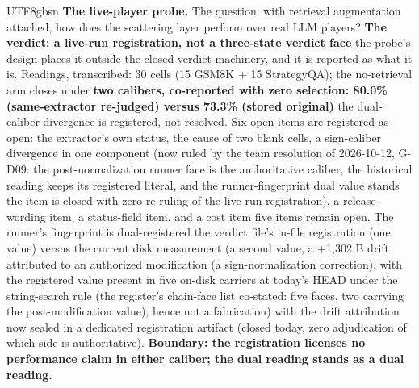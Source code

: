 \documentclass[11pt,letterpaper]{article}
\begin{document}
\begin{CJK}{UTF8}{gbsn}
\textbf{The live-player probe.} The question: with retrieval augmentation attached, how does the scattering layer perform over real LLM players? \textbf{The verdict: a live-run registration, not a three-state verdict face} \textemdash{} the probe's design places it outside the closed-verdict machinery, and it is reported as what it is. Readings, transcribed: 30 cells (15 GSM8K + 15 StrategyQA); the no-retrieval arm closes under \textbf{two calibers, co-reported with zero selection: 80.0\% (same-extractor re-judged) versus 73.3\% (stored original)} \textemdash{} the dual-caliber divergence is registered, not resolved. Six open items are registered as open: the extractor's own status, the cause of two blank cells, a sign-caliber divergence in one component (now ruled by the team resolution of 2026-10-12, G-D09: the post-normalization runner face is the authoritative caliber, the historical reading keeps its registered literal, and the runner-fingerprint dual value stands \textemdash{} the item is closed with zero re-ruling of the live-run registration), a release-wording item, a status-field item, and a cost item \textemdash{} five items remain open. The runner's fingerprint is dual-registered \textemdash{} the verdict file's in-file registration (one value) versus the current disk measurement (a second value, a +1,302 B drift attributed to an authorized modification (a sign-normalization correction), with the registered value present in five on-disk carriers at today's HEAD under the string-search rule (the register's chain-face list co-stated: five faces, two carrying the post-modification value), hence not a fabrication) \textemdash{} with the drift attribution now sealed in a dedicated registration artifact (closed today, zero adjudication of which side is authoritative). \textbf{Boundary: the registration licenses no performance claim in either caliber; the dual reading stands as a dual reading.}


\end{CJK}
\end{document}
